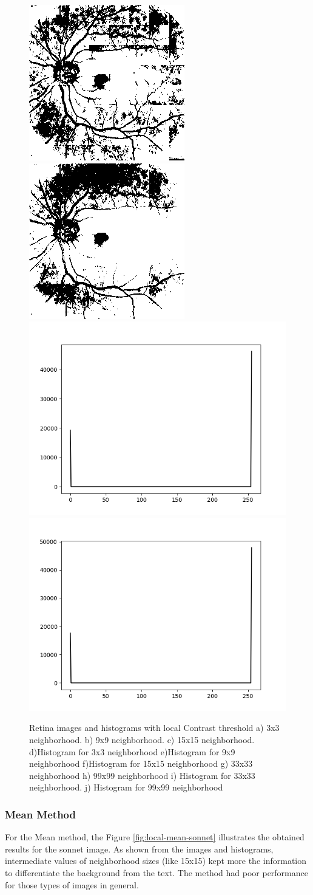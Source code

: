 \documentclass[]{IEEEtran}
\begin{document}
\begin{figure}[H]
  \includegraphics[width=0.3\hsize]{images/33x33-window/retina_contrast.png}
  \includegraphics[width=0.3\hsize]{images/99x99-window/retina_contrast.png}
  \includegraphics[width=0.4\hsize]{images/33x33-window/retina_contrast_histogram.png}
  \includegraphics[width=0.4\hsize]{images/99x99-window/retina_contrast_histogram.png}
  \caption{Retina images and histograms with local Contrast threshold a) 3x3 neighborhood. b) 9x9 neighborhood. c) 15x15 neighborhood. d)Histogram for 3x3 neighborhood e)Histogram for 9x9 neighborhood f)Histogram for 15x15 neighborhood g) 33x33 neighborhood h) 99x99 neighborhood i) Histogram for 33x33 neighborhood. j) Histogram for 99x99 neighborhood}
  \label{fig:local-contrast-retina}
\end{figure}

\subsubsection{Mean Method}
For the Mean method, the Figure \ref{fig:local-mean-sonnet} illustrates the obtained results for the sonnet image. As shown from the images and histograms, intermediate values of neighborhood sizes (like 15x15) kept more the information to differentiate the background from the text. The method had poor performance for those types of images in general. 
\end{document}
